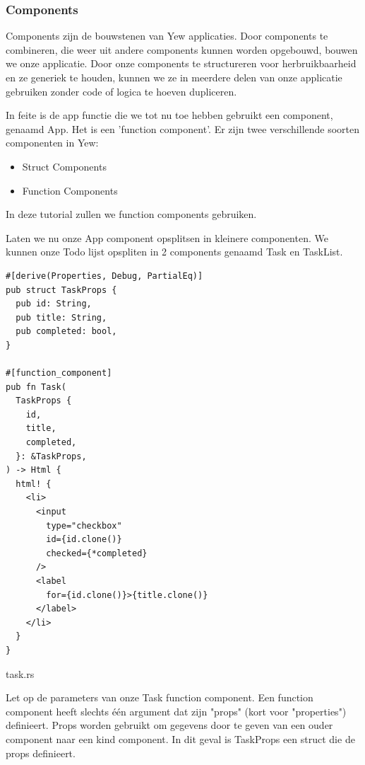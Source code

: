 \clearpage

\subsubsection{Components}

Components zijn de bouwstenen van Yew applicaties. Door components te combineren, die weer uit
andere components kunnen worden opgebouwd, bouwen we onze applicatie. Door onze components te
structureren voor herbruikbaarheid en ze generiek te houden, kunnen we ze in meerdere delen van onze
applicatie gebruiken zonder code of logica te hoeven dupliceren.

In feite is de app functie die we tot nu toe hebben gebruikt een component, genaamd App. Het is een
'function component'. Er zijn twee verschillende soorten componenten in Yew:
\begin{itemize}
  \item Struct Components 
  \item Function Components
\end{itemize}

In deze tutorial zullen we function components gebruiken.

Laten we nu onze App component opsplitsen in kleinere componenten. We kunnen onze Todo lijst
opspliten in 2 components genaamd Task en TaskList.

\begin{listing}[h]
\begin{verbatim}
#[derive(Properties, Debug, PartialEq)]
pub struct TaskProps {
  pub id: String,
  pub title: String,
  pub completed: bool,
}

#[function_component]
pub fn Task(
  TaskProps {
    id,
    title,
    completed,
  }: &TaskProps,
) -> Html {
  html! {
    <li>
      <input
        type="checkbox"
        id={id.clone()}
        checked={*completed}
      />
      <label
        for={id.clone()}>{title.clone()}
      </label>
    </li>
  }
}
\end{verbatim}
\caption{task.rs}
\end{listing}

\clearpage

Let op de parameters van onze Task function component. Een function component heeft slechts één
argument dat zijn "props" (kort voor "properties") definieert. Props worden gebruikt om gegevens
door te geven van een ouder component naar een kind component. In dit geval is TaskProps een struct
die de props definieert.

